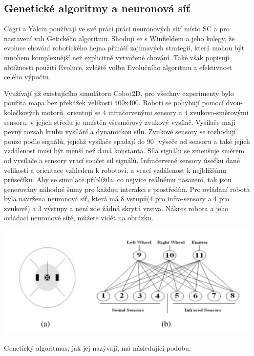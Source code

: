 \subsection{Genetické algoritmy a neuronová síť}
Cagri a Yalcin používají ve své práci \citep{yalcin2008evolving} práci neuronových sítí místo SC a pro nastavení vah Getického algoritmu. Shodují se s Winfieldem a jeho kolegy, že evoluce chování robotického hejna přináší zajímavých strategií, která mohou být mnohem komplexnější než explicitně vytvořené chování. Také však popisují obtížnosti použití Evoluce, zvláště volbu Evolučního algoritmu a efektivnost celého výpočtu. 
\par
Využívají již existujícího simulátoru Cobot2D, pro všechny experimenty bylo použita mapa bez překážek velikosti 400x400. Roboti se pohybují pomocí dvou-kolečkových motorů, orientují se 4 infračervenými sensory a 4 zvukovo-směrovými sensoru, v jejich středu je umístěn všesměrový zvukový vysílač. Vysílače mají pevný rozsah kruhu vysílání a dynamickou sílu. Zvukové sensory se rozhodují pouze podle signálů, jejichž vysílače spadají do $90^\circ$ výseče od sensoru a také jejich vzdálenost musí být menší než daná konstanta. Síla signálu se zmenšuje směrem od vysílače a sensory vrací součet sil signálů. Infračervené sensory úsečku dané velikosti a orientace vzhledem k robotovi, a vrací vzdálenost k nejbližšímu průsečíku. Aby se simulace přiblížila, co nejvíce reálnému nasazení, tak jsou generovány náhodné šumy pro každou interakci s prostředím. Pro ovládání robota byla navržena neuronová síť, která má 8 vstupů(4 pro infra-sensory a 4 pro zvukové) a 3 výstupy a není zde žádná skrytá vrstva. Nákres robota a jeho ovládací neuronové sítě, můžete vidět na obrázku. \par
\begin{center} 
\includegraphics[scale=0.5]{../img/Cobot.png}
\end{center}
\par
Genetický algoritmus, jak jej nazývají, má následující podobu.\par 
